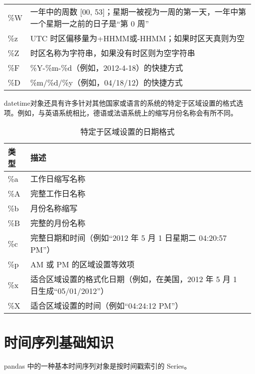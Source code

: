 \begin{table}
\begin{tabular}{ll}
        \%W & 一年中的周数 [00, 53]；星期一被视为一周的第一天，一年中第一个星期一之前的日子是“第 0 周” \\
        \%z & UTC 时区偏移量为+HHMM或-HHMM；如果时区天真则为空                     \\
        \%Z & 时区名称为字符串，如果没有时区则为空字符串                               \\
        \%F & \%Y-\%m-\%d（例如，2012-4-18）的快捷方式                      \\
        \%D & \%m/\%d/\%y（例如，04/18/12）的快捷方式                       \\
        \hline
    \end{tabular}
\end{table}

datetime对象还具有许多针对其他国家或语言的系统的特定于区域设置的格式选项。例如，与英语系统相比，德语或法语系统上的缩写月份名称会有所不同。
\begin{table}
    \caption{特定于区域设置的日期格式}
    \label{tbl11.3}
    \begin{tabular}{ll}
        \hline
        类型  & 描述                                                \\
        \hline
        \%a & 工作日缩写名称                                           \\
        \%A & 完整工作日名称                                           \\
        \%b & 月份名称缩写                                            \\
        \%B & 完整的月份名称                                           \\
        \%c & 完整日期和时间（例如“2012 年 5 月 1 日星期二 04:20:57 PM”）        \\
        \%p & AM 或 PM 的区域设置等效项                                  \\
        \%x & 适合区域设置的格式化日期（例如，在美国，2012 年 5 月 1 日生成“05/01/2012”） \\
        \%X & 适合区域设置的时间（例如“04:24:12 PM”）                        \\
        \hline
    \end{tabular}
\end{table}
\section{时间序列基础知识}
pandas 中的一种基本时间序列对象是按时间戳索引的 Series。

